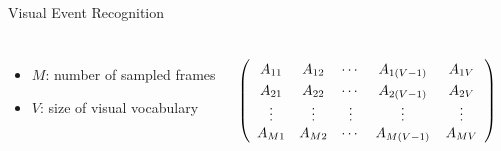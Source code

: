 \documentclass{beamer}
\begin{document}
\begin{frame}{Visual Event Recognition}
\begin{tikzpicture}
                \end{tikzpicture}

                \begin{columns}
                                \begin{itemize}
                                        \item $M$: number of sampled frames
                                        \item $V$: size of visual vocabulary 
                                \end{itemize}

                                \[
                                          \left(\begin{array}{*5{c}}
                                                   A_{11} & A_{12} & \cdots & \tikz[baseline]{\node[anchor=base] (t1) {$A_{1(V-1)}$};} & A_{1V}\\
                                                A_{21} & A_{22} & \cdots & A_{2(V-1)} & A_{2V}\\
                                                \vdots & \vdots & \vdots & \vdots & \vdots\\
                                                A_{M1} & A_{M2} & \cdots & A_{M(V-1)} & A_{MV}\\
                                          \end{array}\right)
                            \]

            \end{columns}

\end{frame}
\end{document}
